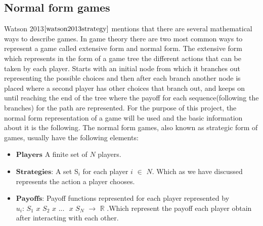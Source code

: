 \subsection{Normal form games}\label{second_section}
Watson 2013$\cite{watson2013strategy}$  mentions that there are several mathematical ways to describe games. In game theory there are two most common ways to represent a game called extensive form and normal form. The extensive form which represents in the form of a game tree the different actions that can be taken by each player. Starts with an initial node from which it branches out representing the possible choices and then after each branch another node is placed where a second player has other choices that branch out,  and keeps on until reaching the end of the tree where the payoff for each sequence(following the branches) for the path are represented. For the purpose of this project, the normal form representation of a game will be used and the basic information about it is the following.
The normal form games, also known as strategic form of games, usually have the following elements:
\begin{itemize}
\item $\textbf{Players}$ A finite set of $\textit{N}$ players.
\item $\textbf{Strategies:}$ A set S$_i$ for each player $\textit{i}$ $\in$ $\textit{N}$. Which as we have discussed represents the action a player chooses.
\item $\textbf{Payoffs:}$ Payoff functions represented for each player represented by $\textit{u$_i$: S$_1$ x S$_2$ x}$ ... $\textit{ x S$_N$}$ $\rightarrow$ $\mathbb{R}$ .Which represent the payoff each player obtain after interacting with each other.
\end{itemize}

